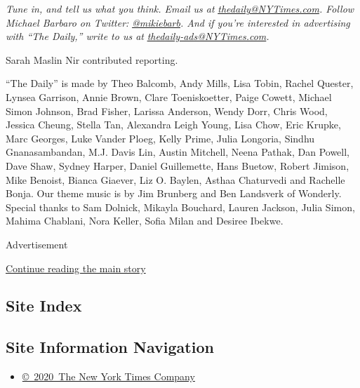 \emph{Tune in, and tell us what you think. Email us at}
\href{mailto:thedaily@NYTimes.com}{\emph{thedaily@NYTimes.com}}\emph{.
Follow Michael Barbaro on Twitter:}
\href{https://twitter.com/mikiebarb}{\emph{@mikiebarb}}\emph{. And if
you're interested in advertising with ``The Daily,'' write to us at}
\href{mailto:thedaily-ads@NYTimes.com}{\emph{thedaily-ads@NYTimes.com}}\emph{.}

Sarah Maslin Nir contributed reporting.

``The Daily'' is made by Theo Balcomb, Andy Mills, Lisa Tobin, Rachel
Quester, Lynsea Garrison, Annie Brown, Clare Toeniskoetter, Paige
Cowett, Michael Simon Johnson, Brad Fisher, Larissa Anderson, Wendy
Dorr, Chris Wood, Jessica Cheung, Stella Tan, Alexandra Leigh Young,
Lisa Chow, Eric Krupke, Marc Georges, Luke Vander Ploeg, Kelly Prime,
Julia Longoria, Sindhu Gnanasambandan, M.J. Davis Lin, Austin Mitchell,
Neena Pathak, Dan Powell, Dave Shaw, Sydney Harper, Daniel Guillemette,
Hans Buetow, Robert Jimison, Mike Benoist, Bianca Giaever, Liz O.
Baylen, Asthaa Chaturvedi and Rachelle Bonja. Our theme music is by Jim
Brunberg and Ben Landsverk of Wonderly. Special thanks to Sam Dolnick,
Mikayla Bouchard, Lauren Jackson, Julia Simon, Mahima Chablani, Nora
Keller, Sofia Milan and Desiree Ibekwe.

Advertisement

\protect\hyperlink{after-bottom}{Continue reading the main story}

\hypertarget{site-index}{%
\subsection{Site Index}\label{site-index}}

\hypertarget{site-information-navigation}{%
\subsection{Site Information
Navigation}\label{site-information-navigation}}

\begin{itemize}
\tightlist
\item
  \href{https://help.nytimes3xbfgragh.onion/hc/en-us/articles/115014792127-Copyright-notice}{©~2020~The
  New York Times Company}
\end{itemize}

